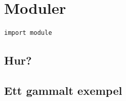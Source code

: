\mode*

\section{Moduler}

\begin{frame}[fragile]
  \begin{lstlisting}[numbers=none,basicstyle=\huge]
import module
  \end{lstlisting}
\end{frame}

\subsection{Hur?}

\begin{frame}[fragile]
  \begin{example}
    
  \end{example}
\end{frame}

\begin{frame}[fragile]
  \begin{example}
    
  \end{example}
\end{frame}

\begin{frame}[fragile]
  \begin{example}
    
  \end{example}
\end{frame}

\subsection{Ett gammalt exempel}

\begin{frame}[fragile]
  \begin{example}
    
  \end{example}
\end{frame}

\begin{frame}[fragile]
  \begin{example}
    
  \end{example}
\end{frame}

